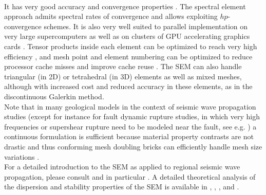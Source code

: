 \\

It has very good accuracy and convergence properties \citep{MaPa89,SePr94,DeFiMu02,Coh02,DeSe07,SeOl08,AiWa09,AiWa10,MeStTh12}.
The spectral element approach admits spectral rates of convergence
and allows exploiting $hp$-convergence schemes. It is also very well
suited to parallel implementation on very large supercomputers \citep{KoTsChTr03,TsKoChTr03,KoLaMi08a,CaKoLaTiMiLeSnTr08,KoViCh10}
as well as on clusters of GPU accelerating graphics cards \citep{Kom11,MiKo10,KoMiEr09,KoErGoMi10}.
Tensor products inside each element can be optimized to reach very
high efficiency \citep{DeFiMu02}, and mesh point and element numbering
can be optimized to reduce processor cache misses and improve cache
reuse \citep{KoLaMi08a}. The SEM can also handle triangular (in 2D)
or tetrahedral (in 3D) elements \citep{WinBoyd96,TaWi00,KoMaTrTaWi01,Coh02,MeViSa06}
as well as mixed meshes, although with increased cost and reduced
accuracy in these elements, as in the discontinuous Galerkin method.\\


Note that in many geological models in the context of seismic wave
propagation studies (except for instance for fault dynamic rupture
studies, in which very high frequencies or supershear rupture need
to be modeled near the fault, see e.g. \citet{BeGlCrViPi07,BeGlCrVi09,PuAmKa09,TaCrEtViBeSa10})
a continuous formulation is sufficient because material property contrasts
are not drastic and thus conforming mesh doubling bricks can efficiently
handle mesh size variations \citep{KoTr02a,KoLiTrSuStSh04,LeChLiKoHuTr08,LeChKoHuTr09,LeKoHuTr09}.\\


For a detailed introduction to the SEM as applied to regional seismic
wave propagation, please consult \citet{PeKoLuMaLeCaLeMaLiBlNiBaTr11,TrKoLi08,KoVi98,KoTr99,ChKoViCaVaFe07}
and in particular \citet{LeKoHuTr09,LeChKoHuTr09,LeChLiKoHuTr08,GoAmTaCaSmSaMaKo09,WiKoScTr04,KoLiTrSuStSh04}.
A detailed theoretical analysis of the dispersion
and stability properties of the SEM is available in \citet{Coh02}, \citet{DeSe07}, \citet{SeOl07}, \citet{SeOl08} and \citet{MeStTh12}.\\


